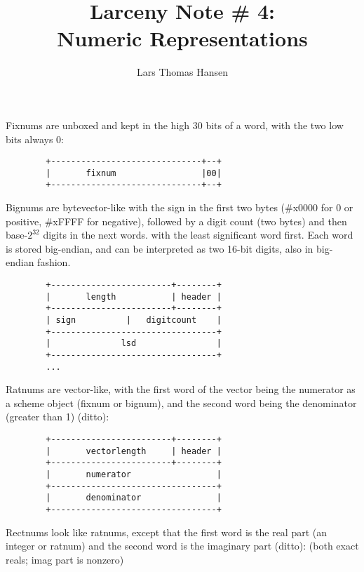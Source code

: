 


\title{Larceny Note \# 4: \\
       Numeric Representations}
\author{Lars Thomas Hansen}


\maketitle

Fixnums are unboxed and kept in the high 30 bits of a word, with the
two low bits always 0:

\begin{verbatim}
        +------------------------------+--+
        |       fixnum                 |00|
        +------------------------------+--+
\end{verbatim}

Bignums are bytevector-like with the sign in the first two bytes
(\#x0000 for 0 or positive, \#xFFFF for negative), followed by a digit
count (two bytes) and then base-$2^32$ digits in the next words.
with the least significant word first. Each word is stored big-endian,
and can be interpreted as two 16-bit digits, also in big-endian
fashion.

\begin{verbatim}
        +------------------------+--------+
        |       length           | header |
        +------------------------+--------+
        | sign          |   digitcount    |
        +---------------------------------+
        |              lsd                |
        +---------------------------------+
        ...
\end{verbatim}

Ratnums are vector-like, with the first word of the vector being the
numerator as a scheme object (fixnum or bignum), and the second word
being the denominator (greater than 1) (ditto):

\begin{verbatim}
        +------------------------+--------+
        |       vectorlength     | header |
        +------------------------+--------+
        |       numerator                 |
        +---------------------------------+
        |       denominator               |
        +---------------------------------+
\end{verbatim}

Rectnums look like ratnums, except that the first word is the real
part (an integer or ratnum) and the second word is the imaginary part
(ditto): (both exact reals; imag part is nonzero)

